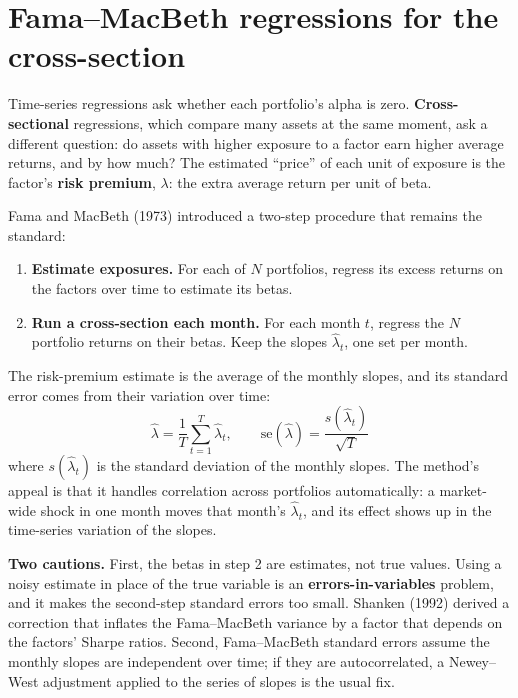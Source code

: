 \section{Fama--MacBeth regressions for the cross-section}
\label{sec:03-fmb}

Time-series regressions ask whether each portfolio's alpha is zero. \textbf{Cross-sectional} regressions, which compare many assets at the same moment, ask a different question: do assets with higher exposure to a factor earn higher average returns, and by how much? The estimated ``price'' of each unit of exposure is the factor's \textbf{risk premium}, $\lambda$: the extra average return per unit of beta.

Fama and MacBeth (1973) introduced a two-step procedure that remains the standard:

\begin{enumerate}
  \item \textbf{Estimate exposures.} For each of $N$ portfolios, regress its excess returns on the factors over time to estimate its betas.
  \item \textbf{Run a cross-section each month.} For each month $t$, regress the $N$ portfolio returns on their betas. Keep the slopes $\hat\lambda_t$, one set per month.
\end{enumerate}

The risk-premium estimate is the average of the monthly slopes, and its standard error comes from their variation over time:
\begin{equation}
  \hat\lambda = \frac{1}{T}\sum_{t=1}^{T}\hat\lambda_t, \qquad \mathrm{se}(\hat\lambda) = \frac{s(\hat\lambda_t)}{\sqrt{T}}
  \label{eq:03-fmb}
\end{equation}
where $s(\hat\lambda_t)$ is the standard deviation of the monthly slopes. The method's appeal is that it handles correlation across portfolios automatically: a market-wide shock in one month moves that month's $\hat\lambda_t$, and its effect shows up in the time-series variation of the slopes.

\textbf{Two cautions.} First, the betas in step 2 are estimates, not true values. Using a noisy estimate in place of the true variable is an \textbf{errors-in-variables} problem, and it makes the second-step standard errors too small. Shanken (1992) derived a correction that inflates the Fama--MacBeth variance by a factor that depends on the factors' Sharpe ratios. Second, Fama--MacBeth standard errors assume the monthly slopes are independent over time; if they are autocorrelated, a Newey--West adjustment applied to the series of slopes is the usual fix.

